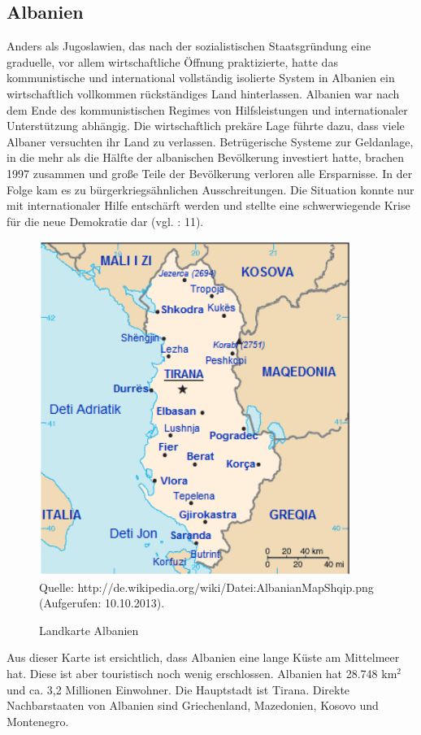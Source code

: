 \subsection{Albanien}
Anders als Jugoslawien, das nach der sozialistischen Staatsgründung eine graduelle, vor allem wirtschaftliche Öffnung praktizierte, hatte das kommunistische und international vollständig isolierte System in Albanien ein wirtschaftlich vollkommen rückständiges Land hinterlassen. Albanien war nach dem Ende des kommunistischen Regimes von Hilfsleistungen und internationaler Unterstützung abhängig. Die wirtschaftlich prekäre Lage führte dazu, dass viele Albaner versuchten ihr Land zu verlassen. Betrügerische Systeme zur Geldanlage, in die mehr als die Hälfte der albanischen Bevölkerung investiert hatte, brachen 1997 zusammen und große Teile der Bevölkerung verloren alle Ersparnisse. In der Folge kam es zu bürgerkriegsähnlichen Ausschreitungen. Die Situation konnte nur mit internationaler Hilfe entschärft werden und stellte eine schwerwiegende Krise für die neue Demokratie dar (vgl. \cite{jarvis}: 11).
\begin{figure}[H]

  \caption{Landkarte Albanien}
  \centering
  \includegraphics[width=4in]{Material/AlbanianMapShqip}\\
  Quelle: http://de.wikipedia.org/wiki/Datei:AlbanianMapShqip.png (Aufgerufen: 10.10.2013).
\end{figure}
Aus dieser Karte ist ersichtlich, dass Albanien eine lange Küste am Mittelmeer hat. Diese ist aber touristisch noch wenig erschlossen. Albanien hat 28.748 km$^2$ und ca. 3,2 Millionen Einwohner. Die Hauptstadt ist Tirana. Direkte Nachbarstaaten von Albanien sind Griechenland, Mazedonien, Kosovo und Montenegro.

